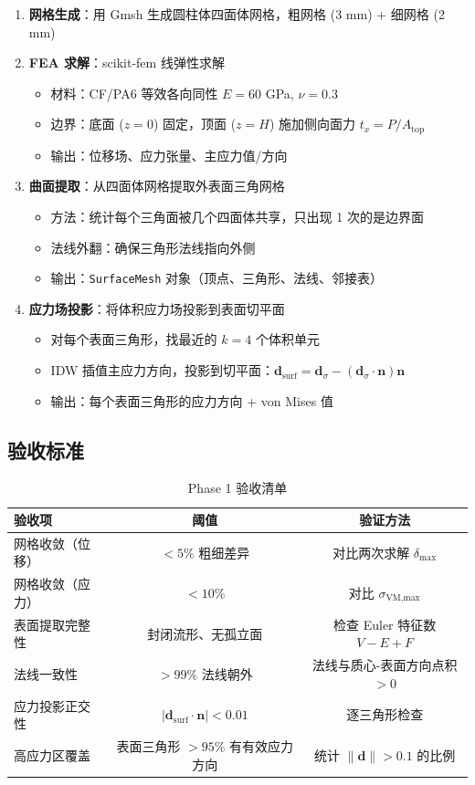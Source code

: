 \documentclass[11pt,a4paper]{article}
\begin{document}
\begin{enumerate}
\item \textbf{网格生成}：用 Gmsh 生成圆柱体四面体网格，粗网格 (3 mm) + 细网格 (2 mm)

\item \textbf{FEA 求解}：scikit-fem 线弹性求解
\begin{itemize}[nosep]
\item 材料：CF/PA6 等效各向同性 $E = 60$ GPa, $\nu = 0.3$
\item 边界：底面 ($z=0$) 固定，顶面 ($z=H$) 施加侧向面力 $t_x = P / A_{\text{top}}$
\item 输出：位移场、应力张量、主应力值/方向
\end{itemize}

\item \textbf{曲面提取}：从四面体网格提取外表面三角网格
\begin{itemize}[nosep]
\item 方法：统计每个三角面被几个四面体共享，只出现 1 次的是边界面
\item 法线外翻：确保三角形法线指向外侧
\item 输出：\texttt{SurfaceMesh} 对象（顶点、三角形、法线、邻接表）
\end{itemize}

\item \textbf{应力场投影}：将体积应力场投影到表面切平面
\begin{itemize}[nosep]
\item 对每个表面三角形，找最近的 $k=4$ 个体积单元
\item IDW 插值主应力方向，投影到切平面：$\mathbf{d}_{\text{surf}} = \mathbf{d}_\sigma - (\mathbf{d}_\sigma \cdot \mathbf{n}) \mathbf{n}$
\item 输出：每个表面三角形的应力方向 + von Mises 值
\end{itemize}
\end{enumerate}

\subsection{验收标准}

\begin{table}[H]
\centering
\begin{tabularx}{\textwidth}{X c c}
\toprule
\textbf{验收项} & \textbf{阈值} & \textbf{验证方法} \\
\midrule
网格收敛（位移）& $< 5\%$ 粗细差异 & 对比两次求解 $\delta_{\max}$ \\
网格收敛（应力）& $< 10\%$ & 对比 $\sigma_{\text{VM,max}}$ \\
表面提取完整性 & 封闭流形、无孤立面 & 检查 Euler 特征数 $V-E+F$ \\
法线一致性 & $> 99\%$ 法线朝外 & 法线与质心-表面方向点积 $> 0$ \\
应力投影正交性 & $|\mathbf{d}_{\text{surf}} \cdot \mathbf{n}| < 0.01$ & 逐三角形检查 \\
高应力区覆盖 & 表面三角形 $> 95\%$ 有有效应力方向 & 统计 $\|\mathbf{d}\| > 0.1$ 的比例 \\
\bottomrule
\end{tabularx}
\caption{Phase 1 验收清单}
\end{table}
\end{document}
